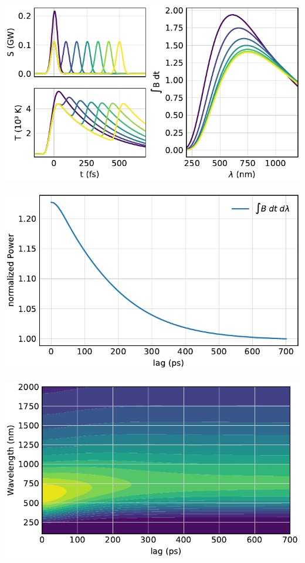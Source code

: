 \begin{frame}
	\centering
	\includegraphics{../model/figures/double pump sweep.pdf}
\end{frame}

\begin{frame}
	\centering
	\includegraphics{../model/figures/autocorrelation.pdf}
\end{frame}

\begin{frame}
	\centering
	\includegraphics{../model/figures/autocorrelation spectrum.pdf}
\end{frame}
